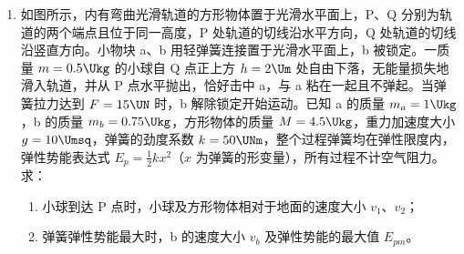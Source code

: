 \documentclass[\gkver]{gaokaozhenti}
\begin{document}
\begin{enumerate}
{解得 $h_{4} = \frac{11}{10}h_{1}$

外界对气体做功 $W_{3} = p_{3}(h_{2} - h_{4})S = \frac{14p_{0}h_{1}S}{63}$

全程中外界对气体做功 $W = W_{1} + W_{2} + W_{3} = -\frac{8p_{0}h_{1}S}{63}$

因为 $T_{1} = T_{4}$，故封闭的理想气体总内能变化 $\Delta U = 0$

利用热力学第一定律 $\Delta U = W + Q$

解得 $Q = \frac{8}{63}p_{0}h_{1}S$

故封闭气体吸收的净热量 $Q = \frac{8}{63}p_{0}h_{1}S$。
}

\item
如图所示，内有弯曲光滑轨道的方形物体置于光滑水平面上，P、Q 分别为轨道的两个端点且位于同一高度，P 处轨道的切线沿水平方向，Q 处轨道的切线沿竖直方向。小物块 a、b 用轻弹簧连接置于光滑水平面上，b 被锁定。一质量 $m = 0.5 \Ukg$ 的小球自 Q 点正上方 $h = 2 \Um$ 处自由下落，无能量损失地滑入轨道，并从 P 点水平抛出，恰好击中 a，与 a 粘在一起且不弹起。当弹簧拉力达到 $F = 15 \UN$ 时，b 解除锁定开始运动。已知 a 的质量 $m_{a} = 1 \Ukg$，b 的质量 $m_{b} = 0.75 \Ukg$，方形物体的质量 $M = 4.5 \Ukg$，重力加速度大小 $g = 10 \Umsq$，弹簧的劲度系数 $k = 50 \UNm$，整个过程弹簧均在弹性限度内，弹性势能表达式 $E_{p} = \frac{1}{2}kx^{2}$（$x$ 为弹簧的形变量），所有过程不计空气阻力。求：
\begin{enumerate}
	\item
	小球到达 P 点时，小球及方形物体相对于地面的速度大小 $v_{1}$、$v_{2}$；
	\item
	弹簧弹性势能最大时，b 的速度大小 $v_{b}$ 及弹性势能的最大值 $E_{pm}$。
\end{enumerate}


\end{enumerate}
\end{document}
